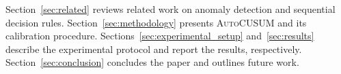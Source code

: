 Section~\ref{sec:related} reviews related work on anomaly detection and sequential decision rules. Section~\ref{sec:methodology} presents \textsc{AutoCUSUM} and its calibration procedure. Sections~\ref{sec:experimental_setup} and~\ref{sec:results} describe the experimental protocol and report the results, respectively. Section~\ref{sec:conclusion} concludes the paper and outlines future work.
